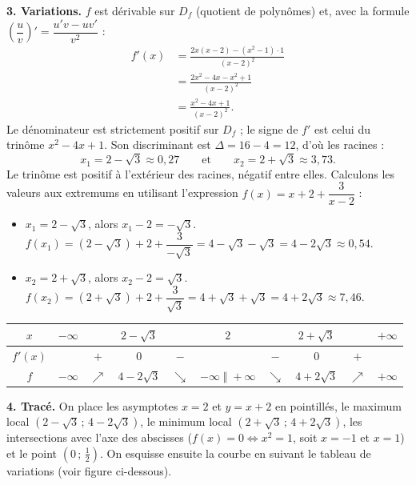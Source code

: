 \documentclass[11pt]{article}
\begin{document}
\begin{exoresolu}
\textbf{3. Variations.} $f$ est dérivable sur $D_f$ (quotient de polynômes) et, avec la formule $\left(\dfrac{u}{v}\right)' = \dfrac{u'v - uv'}{v^2}$ :
\begin{align*}
f'(x) &= \frac{2x(x-2) - (x^2-1)\cdot 1}{(x-2)^2} \\
      &= \frac{2x^2 - 4x - x^2 + 1}{(x-2)^2} \\
      &= \frac{x^2 - 4x + 1}{(x-2)^2}.
\end{align*}
Le dénominateur est strictement positif sur $D_f$ ; le signe de $f'$ est celui du trinôme $x^2 - 4x + 1$. Son discriminant est $\Delta = 16 - 4 = 12$, d'où les racines :
\[ x_1 = 2 - \sqrt{3} \approx 0{,}27 \qquad \text{et} \qquad x_2 = 2 + \sqrt{3} \approx 3{,}73. \]
Le trinôme est positif à l'extérieur des racines, négatif entre elles.
Calculons les valeurs aux extremums en utilisant l'expression $f(x) = x + 2 + \dfrac{3}{x-2}$ :
\begin{itemize}
\item $x_1 = 2 - \sqrt{3}$, alors $x_1 - 2 = -\sqrt{3}$.
  $f(x_1) = (2-\sqrt{3}) + 2 + \dfrac{3}{-\sqrt{3}} = 4 - \sqrt{3} - \sqrt{3} = 4 - 2\sqrt{3} \approx 0{,}54$.
\item $x_2 = 2 + \sqrt{3}$, alors $x_2 - 2 = \sqrt{3}$.
  $f(x_2) = (2+\sqrt{3}) + 2 + \dfrac{3}{\sqrt{3}} = 4 + \sqrt{3} + \sqrt{3} = 4 + 2\sqrt{3} \approx 7{,}46$.
\end{itemize}

\begin{center}
\begin{tabular}{|c|ccccccccc|}\hline
$x$ & $-\infty$ & & $2-\sqrt{3}$ & & $2$ & & $2+\sqrt{3}$ & & $+\infty$ \\ \hline
$f'(x)$ & & $+$ & $0$ & $-$ & & $-$ & $0$ & $+$ & \\ \hline
$f$ & $-\infty$ & $\nearrow$ & $4-2\sqrt{3}$ & $\searrow$ & $-\infty \;\Vert\; +\infty$ & $\searrow$ & $4+2\sqrt{3}$ & $\nearrow$ & $+\infty$ \\ \hline
\end{tabular}
\end{center}

\textbf{4. Tracé.} On place les asymptotes $x = 2$ et $y = x + 2$ en pointillés, le maximum local $\left(2-\sqrt{3}\,;\,4-2\sqrt{3}\right)$, le minimum local $\left(2+\sqrt{3}\,;\,4+2\sqrt{3}\right)$, les intersections avec l'axe des abscisses ($f(x)=0 \Leftrightarrow x^2=1$, soit $x=-1$ et $x=1$) et le point $\left(0\,;\,\tfrac{1}{2}\right)$. On esquisse ensuite la courbe en suivant le tableau de variations (voir figure ci-dessous).
\end{exoresolu}
\end{document}
